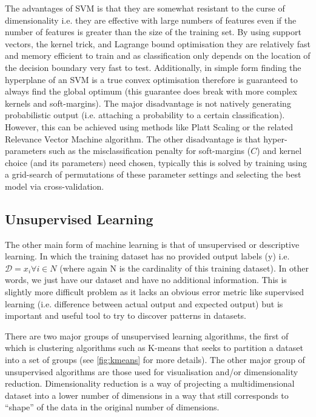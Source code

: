 The advantages of SVM is that they are somewhat resistant to the curse of dimensionality i.e. they are effective with large numbers of features
even if the number of features is greater than the size of the training set.  By using support vectors, the kernel trick, and Lagrange bound optimisation 
they are relatively fast and memory efficient to train and as classification only depends on the location of the decision boundary very fast to test.
Additionally, in simple form finding the hyperplane of an SVM is a true convex optimisation therefore is guaranteed to always find the global optimum (this
guarantee does break with more complex kernels and soft-margins).  
The major disadvantage is not natively generating probabilistic output (i.e. attaching a probability to a certain classification).  However, this can be achieved
using methods like Platt Scaling or the related Relevance Vector Machine algorithm.   The other disadvantage is that hyper-parameters such as the misclassification
penalty for soft-margins (\(C\)) and kernel choice (and its parameters) need chosen, typically this is solved by training using a grid-search of permutations
of these parameter settings and selecting the best model via cross-validation.


\subsection{Unsupervised Learning}

The other main form of machine learning is that of unsupervised or descriptive learning.
In which the training dataset has no provided output labels (y) i.e. 
\(\mathcal{D} = {x_{i} \forall i \in N}\) (where again N is the cardinality of 
this training dataset). In other words, we just have our dataset and have no additional information.
This is slightly more difficult problem as it lacks an obvious error metric like supervised learning 
(i.e. difference between actual output and expected output) but is important and useful tool to
try to discover patterns in datasets.

There are two major groups of unsupervised learning algorithms, the first of which is clustering algorithms
such as K-means that seeks to partition a dataset into a set of groups (see \ref{fig:kmeans} for more details).
The other major group of unsupervised algorithms are those used for visualisation and/or
dimensionality reduction.  Dimensionality reduction is a way of projecting a multidimensional
dataset into a lower number of dimensions in a way that still corresponds to
``shape'' of the data in the original number of dimensions.  

